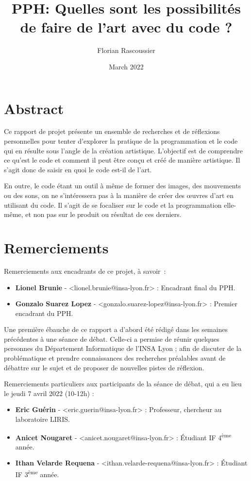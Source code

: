 \documentclass[12pt]{article} %
\title{PPH: Quelles sont les possibilités de faire de l'art avec du code ?}
\author{Florian Rascoussier}
\date{March 2022}
\newcommand{\ts}{\textsuperscript} %
\begin{document}

\newpage


\newpage

\section*{Abstract}
Ce rapport de projet présente un ensemble de recherches et de réflexions personnelles pour tenter d'explorer la pratique de la programmation et le code qui en résulte sous l'angle de la création artistique. L'objectif est de comprendre ce qu'est le code et comment il peut être conçu et créé de manière artistique. Il s'agit donc de saisir en quoi le code est-il de l'art.

En outre, le code étant un outil à même de former des images, des mouvements ou des sons, on ne s'intéressera pas à la manière de créer des œuvres d'art en utilisant du code. Il s'agit de se focaliser sur le code et la programmation elle-même, et non pas sur le produit ou résultat de ces derniers.

\section*{Remerciements}
Remerciements aux encadrants de ce projet, à savoir :

\begin{itemize}
    \item \textbf{Lionel Brunie} - <lionel.brunie@insa-lyon.fr> : Encadrant final  du PPH.
    \item \textbf{Gonzalo Suarez Lopez} - <gonzalo.suarez-lopez@insa-lyon.fr> : Premier encadrant du PPH.
\end{itemize}

Une première ébauche de ce rapport a d'abord été rédigé dans les semaines précédentes à une séance de débat. Celle-ci a permise de réunir quelques personnes du Département Informatique de l'INSA Lyon ; afin de discuter de la problématique et prendre connaissances des recherches préalables avant de débattre sur le sujet et de proposer de nouvelles pistes de réflexion.

Remerciements particuliers aux participants de la séance de débat, qui a eu lieu le jeudi 7 avril 2022 (10-12h) :

\begin{itemize}
    \item \textbf{Eric Guérin} - <eric.guerin@insa-lyon.fr> : Professeur, chercheur au laboratoire LIRIS.
    \item \textbf{Anicet Nougaret} - <anicet.nougaret@insa-lyon.fr> : Étudiant IF 4\ts{ème} année. 
    \item \textbf{Ithan Velarde Requena} - <ithan.velarde-requena@insa-lyon.fr> : Étudiant IF 3\ts{ème} année.
\end{itemize}
\end{document}
